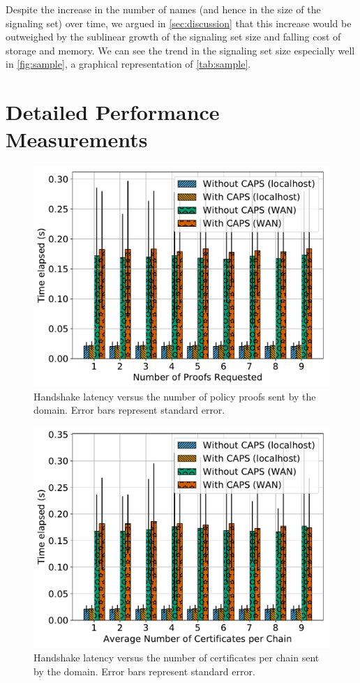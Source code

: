 Despite the increase in the number of names (and hence in the size of the
signaling set) over time, we argued in \autoref{sec:discussion} that this
increase would be outweighed by the sublinear growth of the signaling set size
and falling cost of storage and memory. We can see the trend in the signaling
set size especially well in \autoref{fig:sample}, a graphical representation of
\autoref{tab:sample}.

\section{Detailed Performance Measurements}
\label{sec:overhead}

\begin{figure}[t]
  \centering
  \includegraphics[width=0.8\linewidth]{fig/eval_tls_ext/0-time_elapsed_vs_num_proofs_requested}
  \caption{Handshake latency versus the number of policy proofs sent by the
  domain. Error bars represent standard error.}
  \label{fig:numproofs}
\end{figure}

\begin{figure}[t]
  \centering
  \includegraphics[width=0.8\linewidth]{fig/eval_tls_ext/2-time_elapsed_vs_num_certs_per_chain}
  \caption{Handshake latency versus the number of certificates per chain sent by the
  domain. Error bars represent standard error.}
  \label{fig:numcerts}
\end{figure}

